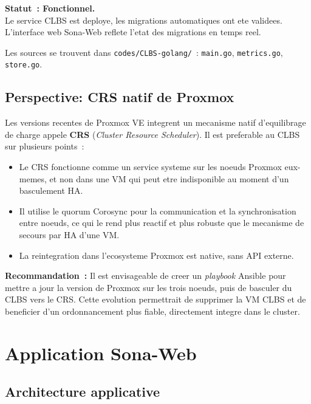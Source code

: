 \documentclass[a4paper,11pt]{article}
\newenvironment{infobox}{%
  \begin{mdframed}[linecolor=bleu,backgroundcolor=bleu!5,linewidth=1pt,
    leftmargin=0pt,rightmargin=0pt,innertopmargin=6pt,innerbottommargin=6pt]
}{%
  \end{mdframed}
}
\newenvironment{successbox}{%
  \begin{mdframed}[linecolor=vert,backgroundcolor=vert!7,linewidth=1pt,
    leftmargin=0pt,rightmargin=0pt,innertopmargin=6pt,innerbottommargin=6pt]
}{%
  \end{mdframed}
}
\begin{document}
\begin{successbox}
  \textbf{Statut~: Fonctionnel.}\\
  Le service CLBS est deploye, les migrations automatiques ont ete validees.
  L'interface web Sona-Web reflete l'etat des migrations en temps reel.
\end{successbox}

Les sources se trouvent dans \texttt{codes/CLBS-golang/}~: \texttt{main.go},
\texttt{metrics.go}, \texttt{store.go}.

\subsection{Perspective: CRS natif de Proxmox}

Les versions recentes de Proxmox VE integrent un mecanisme natif d'equilibrage
de charge appele \textbf{CRS} (\textit{Cluster Resource Scheduler}). Il est preferable
au CLBS sur plusieurs points~:

\begin{itemize}[noitemsep]
  \item Le CRS fonctionne comme un service systeme sur les noeuds Proxmox eux-memes,
        et non dans une VM qui peut etre indisponible au moment d'un basculement HA.
  \item Il utilise le quorum Corosync pour la communication et la synchronisation
        entre noeuds, ce qui le rend plus reactif et plus robuste que le mecanisme
        de secours par HA d'une VM.
  \item La reintegration dans l'ecosysteme Proxmox est native, sans API externe.
\end{itemize}

\begin{infobox}
  \textbf{Recommandation~:} Il est envisageable de creer un \textit{playbook} Ansible
  pour mettre a jour la version de Proxmox sur les trois noeuds, puis de basculer
  du CLBS vers le CRS. Cette evolution permettrait de supprimer la VM CLBS et de
  beneficier d'un ordonnancement plus fiable, directement integre dans le cluster.
\end{infobox}

\section{Application Sona-Web}

\subsection{Architecture applicative}
\end{document}
